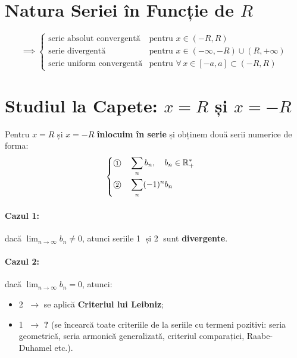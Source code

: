 \documentclass[12pt, a4paper]{report}
\begin{document}
	\section{Natura Seriei în Funcție de $R$}
	
	\[
	\implies
	\begin{cases}
		\text{serie absolut convergentă} & \text{pentru } x \in (-R, R) \\[1mm]
		\text{serie divergentă} & \text{pentru } x \in (-\infty, -R) \cup (R, +\infty) \\[1mm]
		\text{serie uniform convergentă} & \text{pentru } \forall\, x \in [-a, a] \subset (-R, R)
	\end{cases}
	\]
	
	\section{Studiul la Capete: $x = R$ și $x = -R$}
	
	Pentru $x = R$ și $x = -R$ \textbf{înlocuim în serie} și obținem două serii numerice de forma:
	\[
	\begin{cases}
		\text{\textcircled{\scriptsize 1}} \quad \displaystyle \sum_{n} b_n, \quad b_n \in \mathbb{R}_+^{*} \\[4mm]
		\text{\textcircled{\scriptsize 2}} \quad \displaystyle \sum_{n} (-1)^n b_n
	\end{cases}
	\]
	
	\paragraph{Cazul 1:} dacă $\displaystyle \lim_{n \to \infty} b_n \neq 0$, atunci seriile \textcircled{\scriptsize 1} și \textcircled{\scriptsize 2} sunt \textbf{divergente}.
	
	\paragraph{Cazul 2:} dacă $\displaystyle \lim_{n \to \infty} b_n = 0$, atunci:
	\begin{itemize}
		\item \textcircled{\scriptsize 2} $\to$ se aplică \textbf{Criteriul lui Leibniz};
		\item \textcircled{\scriptsize 1} $\to$ \textbf{?} \; (se încearcă toate criteriile de la seriile cu termeni pozitivi: seria geometrică, seria armonică generalizată, criteriul comparației, Raabe-Duhamel etc.).
	\end{itemize}
	
\end{document}
